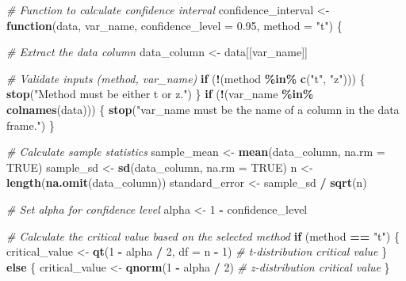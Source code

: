 \documentclass[
  11pt,
]{article}
\newenvironment{Shaded}{\begin{snugshade}}{\end{snugshade}}
\newcommand{\AttributeTok}[1]{\textcolor[rgb]{0.13,0.29,0.53}{#1}}
\newcommand{\CommentTok}[1]{\textcolor[rgb]{0.56,0.35,0.01}{\textit{#1}}}
\newcommand{\ConstantTok}[1]{\textcolor[rgb]{0.56,0.35,0.01}{#1}}
\newcommand{\ControlFlowTok}[1]{\textcolor[rgb]{0.13,0.29,0.53}{\textbf{#1}}}
\newcommand{\DecValTok}[1]{\textcolor[rgb]{0.00,0.00,0.81}{#1}}
\newcommand{\FloatTok}[1]{\textcolor[rgb]{0.00,0.00,0.81}{#1}}
\newcommand{\FunctionTok}[1]{\textcolor[rgb]{0.13,0.29,0.53}{\textbf{#1}}}
\newcommand{\NormalTok}[1]{#1}
\newcommand{\OtherTok}[1]{\textcolor[rgb]{0.56,0.35,0.01}{#1}}
\newcommand{\SpecialCharTok}[1]{\textcolor[rgb]{0.81,0.36,0.00}{\textbf{#1}}}
\newcommand{\StringTok}[1]{\textcolor[rgb]{0.31,0.60,0.02}{#1}}
\begin{document}
\begin{Shaded}
\begin{Highlighting}[]
\CommentTok{\# Function to calculate confidence interval}
\NormalTok{confidence\_interval }\OtherTok{\textless{}{-}} \ControlFlowTok{function}\NormalTok{(data, var\_name, }\AttributeTok{confidence\_level =} \FloatTok{0.95}\NormalTok{, }\AttributeTok{method =} \StringTok{"t"}\NormalTok{) \{}

  \CommentTok{\# Extract the data column}
\NormalTok{  data\_column }\OtherTok{\textless{}{-}}\NormalTok{ data[[var\_name]]}

  \CommentTok{\# Validate inputs (method, var\_name)}
  \ControlFlowTok{if}\NormalTok{ (}\SpecialCharTok{!}\NormalTok{(method }\SpecialCharTok{\%in\%} \FunctionTok{c}\NormalTok{(}\StringTok{"t"}\NormalTok{, }\StringTok{"z"}\NormalTok{))) \{}
    \FunctionTok{stop}\NormalTok{(}\StringTok{"Method must be either \textquotesingle{}t\textquotesingle{} or \textquotesingle{}z\textquotesingle{}."}\NormalTok{)}
\NormalTok{  \}}
  \ControlFlowTok{if}\NormalTok{ (}\SpecialCharTok{!}\NormalTok{(var\_name }\SpecialCharTok{\%in\%} \FunctionTok{colnames}\NormalTok{(data))) \{}
    \FunctionTok{stop}\NormalTok{(}\StringTok{"var\_name must be the name of a column in the data frame."}\NormalTok{)}
\NormalTok{  \}}

  \CommentTok{\# Calculate sample statistics}
\NormalTok{  sample\_mean }\OtherTok{\textless{}{-}} \FunctionTok{mean}\NormalTok{(data\_column, }\AttributeTok{na.rm =} \ConstantTok{TRUE}\NormalTok{)}
\NormalTok{  sample\_sd }\OtherTok{\textless{}{-}} \FunctionTok{sd}\NormalTok{(data\_column, }\AttributeTok{na.rm =} \ConstantTok{TRUE}\NormalTok{)}
\NormalTok{  n }\OtherTok{\textless{}{-}} \FunctionTok{length}\NormalTok{(}\FunctionTok{na.omit}\NormalTok{(data\_column))}
\NormalTok{  standard\_error }\OtherTok{\textless{}{-}}\NormalTok{ sample\_sd }\SpecialCharTok{/} \FunctionTok{sqrt}\NormalTok{(n)}

  \CommentTok{\# Set alpha for confidence level}
\NormalTok{  alpha }\OtherTok{\textless{}{-}} \DecValTok{1} \SpecialCharTok{{-}}\NormalTok{ confidence\_level}

  \CommentTok{\# Calculate the critical value based on the selected method}
  \ControlFlowTok{if}\NormalTok{ (method }\SpecialCharTok{==} \StringTok{"t"}\NormalTok{) \{}
\NormalTok{    critical\_value }\OtherTok{\textless{}{-}} \FunctionTok{qt}\NormalTok{(}\DecValTok{1} \SpecialCharTok{{-}}\NormalTok{ alpha }\SpecialCharTok{/} \DecValTok{2}\NormalTok{, }\AttributeTok{df =}\NormalTok{ n }\SpecialCharTok{{-}} \DecValTok{1}\NormalTok{)  }\CommentTok{\# t{-}distribution critical value}
\NormalTok{  \} }\ControlFlowTok{else}\NormalTok{ \{}
\NormalTok{    critical\_value }\OtherTok{\textless{}{-}} \FunctionTok{qnorm}\NormalTok{(}\DecValTok{1} \SpecialCharTok{{-}}\NormalTok{ alpha }\SpecialCharTok{/} \DecValTok{2}\NormalTok{)  }\CommentTok{\# z{-}distribution critical value}
\NormalTok{  \}}


\end{Highlighting}
\end{Shaded}
\end{document}

